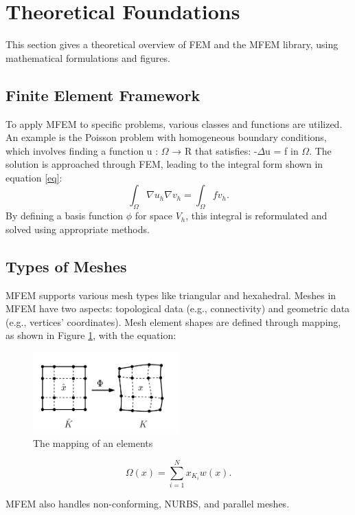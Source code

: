 \section{Theoretical Foundations}
This section gives a theoretical overview of FEM and the MFEM library, using mathematical formulations and figures.
\subsection{Finite Element Framework}
To apply MFEM to specific problems, various classes and functions are utilized. An example is the Poisson problem with homogeneous boundary conditions, which involves finding a function u : $\Omega$ → R that satisfies:
-$\Delta$u = f in $\Omega$.
The solution is approached through FEM, leading to the integral form shown in equation \ref{eq}:
\begin{equation}
    \int_{\Omega} \nabla u_h \nabla v_h = \int_{\Omega} f v_h.
    \label{eq}
\end{equation}
By defining a basis function $\phi$ for space $V_h$, this integral is reformulated and solved using appropriate methods.

\subsection{Types of Meshes}
MFEM supports various mesh types like triangular and hexahedral. Meshes in MFEM have two aspects: topological data (e.g., connectivity) and geometric data (e.g., vertices' coordinates). Mesh element shapes are defined through mapping, as shown in Figure \ref{figure_1}, with the equation:

\begin{figure}[hbt!]
    \centering
    \includegraphics[width=0.5\textwidth]{figures/f1.png}
    \caption{The mapping of an elements}
    \label{figure_1}
\end{figure}

\begin{equation}
    \Omega(x) = \sum_{i=1}^N x_{K_i} w(x).
\end{equation}

MFEM also handles non-conforming, NURBS, and parallel meshes.
